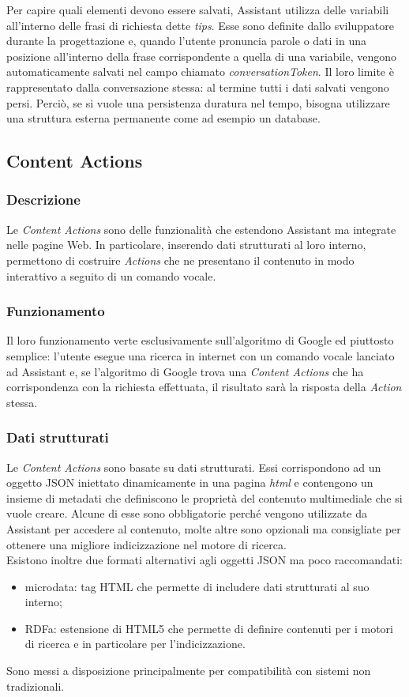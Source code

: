		Per capire quali elementi devono essere salvati, Assistant utilizza delle variabili all'interno delle frasi di richiesta dette \emph{tips}. Esse sono definite dallo sviluppatore durante la progettazione e, quando l'utente pronuncia parole o dati in una posizione all'interno della frase corrispondente a quella di una variabile, vengono automaticamente salvati nel campo chiamato \emph{conversationToken}. Il loro limite è rappresentato dalla conversazione stessa: al termine tutti i dati salvati vengono persi. Perciò, se si vuole una persistenza duratura nel tempo, bisogna utilizzare una struttura esterna permanente come ad esempio un database.
	\subsection{Content Actions}
		\subsubsection{Descrizione}
		Le \emph{Content Actions} sono delle funzionalità che estendono Assistant ma integrate nelle pagine Web. In particolare, inserendo dati strutturati al loro interno, permettono di costruire \emph{Actions} che ne presentano il contenuto in modo interattivo a seguito di un comando vocale.
		\subsubsection{Funzionamento}
		Il loro funzionamento verte esclusivamente sull'algoritmo di Google ed piuttosto semplice: l'utente esegue una ricerca in internet con un comando vocale lanciato ad Assistant e, se l'algoritmo di Google trova una \emph{Content Actions} che ha corrispondenza con la richiesta effettuata, il risultato sarà la risposta della \emph{Action} stessa.
		\subsubsection{Dati strutturati}
		Le \emph{Content Actions} sono basate su dati strutturati. Essi corrispondono ad un oggetto JSON iniettato dinamicamente in una pagina \emph{\gls{html}} e contengono un insieme di metadati che definiscono le proprietà del contenuto multimediale che si vuole creare. Alcune di esse sono obbligatorie perché vengono utilizzate da Assistant per accedere al contenuto, molte altre sono opzionali ma consigliate per ottenere una migliore indicizzazione nel motore di ricerca. \\
		Esistono inoltre due formati alternativi agli oggetti JSON ma poco raccomandati:
		\begin{itemize}
			\item microdata: tag HTML che permette di includere dati strutturati al suo interno;
			\item RDFa: estensione di HTML5 che permette di definire contenuti per i motori di ricerca e in particolare per l'indicizzazione.
		\end{itemize}
		Sono messi a disposizione principalmente per compatibilità con sistemi non tradizionali.
